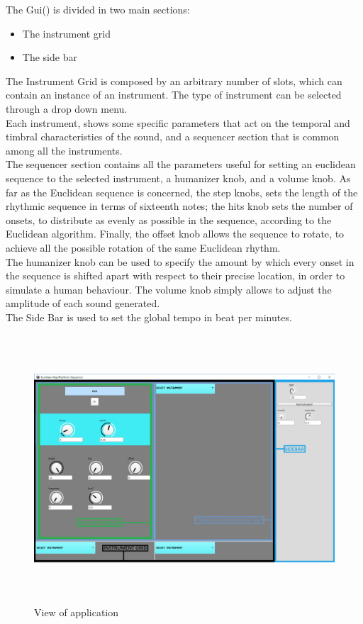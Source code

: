 \documentclass[main.tex]{subfiles}
\begin{document}
The Gui() is divided in two main sections:
\begin{itemize}[noitemsep]
\item The instrument grid
\item The side bar
\end{itemize}
The Instrument Grid is composed by an arbitrary number of slots, which can contain an instance of an instrument. The type of instrument can be selected through a drop down menu.\\
Each instrument, shows some specific parameters that act on the temporal and timbral characteristics of the sound, and a sequencer section that is common among all the instruments.\\
The sequencer section contains all the parameters useful for setting an euclidean sequence to the selected instrument, a humanizer knob, and a volume knob. 
As far as the Euclidean sequence is concerned, the step knobs, sets the length of the rhythmic sequence in terms of sixteenth notes; the hits knob sets the number of onsets, to distribute as evenly as possible in the sequence, according to the Euclidean algorithm. Finally, the offset knob allows the sequence to rotate, to achieve all the possible rotation of the same Euclidean rhythm.\\
The humanizer knob can be used to specify the amount by which every onset in the sequence is shifted apart with respect to their precise location, in order to simulate a human behaviour.
The volume knob simply allows to adjust the amplitude of each sound generated.\\
The Side Bar is used to set the global tempo in beat per minutes.\\
\begin{figure}[htbp]
\centering
\includegraphics[height=10cm, width=15cm, keepaspectratio]{images/gui.png}
\caption{View of application}
\label{fig:gui}
\end{figure}
\end{document}

